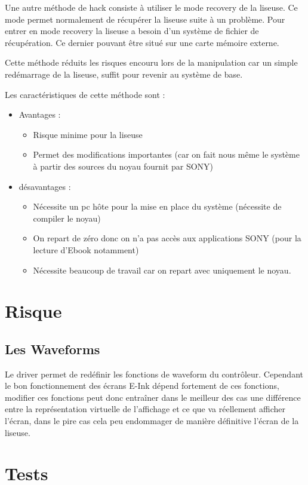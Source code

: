 Une autre méthode de hack consiste à utiliser le mode recovery de la liseuse.
Ce mode permet normalement de récupérer la liseuse suite à un problème.
Pour entrer en mode recovery la liseuse a besoin d'un système de fichier de récupération.
Ce dernier pouvant être situé sur une carte mémoire externe.

Cette méthode réduits les risques encouru lors de la manipulation car un simple redémarrage de la liseuse, 
suffit pour revenir au système de base.

Les caractéristiques de cette méthode sont  : 
\begin{itemize}
	\renewcommand{\labelitemi}{$\bullet$}
	\item Avantages : 
	\begin{itemize}
		\item Risque minime pour la liseuse
		\item Permet des modifications importantes (car on fait nous même le système à partir des sources du noyau fournit par SONY)%
	\end{itemize}
	\item désavantages : 
		\begin{itemize}
			\item Nécessite un pc hôte pour la mise en place du système (nécessite de compiler le noyau)
			\item On repart de zéro donc on n'a pas accès aux applications SONY (pour la lecture d'Ebook notamment)
			\item Nécessite beaucoup de travail car on repart avec uniquement le noyau.
		\end{itemize}
\end{itemize}
\section{Risque}
\subsection{Les Waveforms}
	Le driver permet de redéfinir les fonctions de waveform du contrôleur.
Cependant le bon fonctionnement des écrans E-Ink dépend fortement de ces fonctions, modifier ces fonctions peut donc entraîner dans le meilleur des cas une différence entre la représentation virtuelle de l'affichage et ce que va réellement afficher l'écran, dans le pire cas cela peu endommager de manière définitive l'écran de la liseuse.

\section{Tests}

